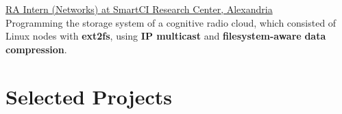 \documentclass[letterpaper]{twentysecondcv} %
\begin{document}
\begin{twenty}

               {\underline{RA Intern (Networks) at \textcolor{OliveGreen}{SmartCI Research Center}, Alexandria}}
               {}
               {\\
                Programming the storage system of a cognitive radio cloud, which consisted of
                Linux nodes with \textbf{ext2fs}, using \textbf{IP multicast} and \textbf{filesystem-aware}
                \textbf{data compression}.}

\end{twenty}


\section{Selected Projects}
\end{document}
